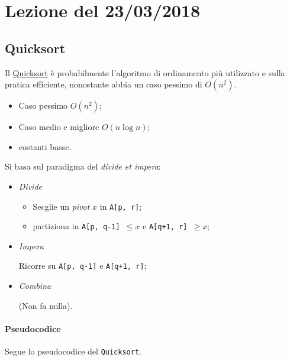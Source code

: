 \section{Lezione del 23/03/2018}

\subsection{Quicksort}
Il \href{https://en.wikipedia.org/wiki/Quicksort}{Quicksort} è probabilmente l'algoritmo di ordinamento
più utilizzato e sulla pratica efficiente, nonostante abbia un caso pessimo di $O(n^2)$.
\begin{itemize}
	\item Caso pessimo $O(n^2)$;
	\item Caso medio e migliore $O(n \log n)$;
	\item costanti basse.
\end{itemize}
Si basa sul paradigma del \textit{divide et impera}:
\begin{itemize}
	\item \textit{Divide}
	\begin{itemize}[label=$\rightarrow$]
		\item Secglie un \textit{pivot} $x$ in \texttt{A[p, r]};
		\item partiziona in \texttt{A[p, q-1] $\leq x$} e \texttt{A[q+1, r] $\geq x$};
	\end{itemize}
	\item \textit{Impera} \par
	Ricorre su \texttt{A[p, q-1]} e \texttt{A[q+1, r]};
	\item \textit{Combina}\par
	(Non fa nulla).
\end{itemize}

\paragraph{Pseudocodice} Segue lo pseudocodice del \texttt{Quicksort}.



